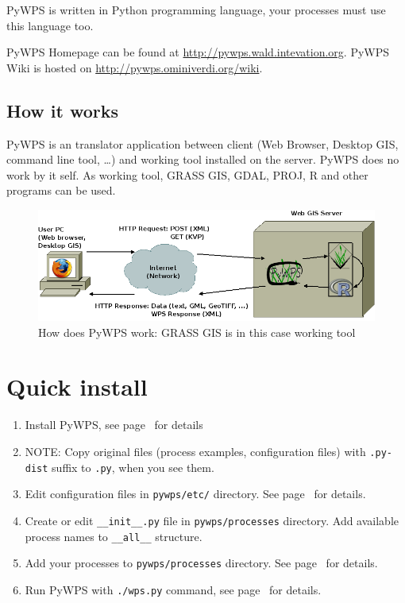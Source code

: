 \documentclass[a4paper,11pt]{article}
\newcommand{\pywpssite}{\url{http://pywps.wald.intevation.org}}
\newcommand{\pywpswiki}{\url{http://pywps.ominiverdi.org/wiki}}
\begin{document}
PyWPS is written in Python programming language, your processes must use
this language too. 

PyWPS Homepage can be found at \pywpssite.
PyWPS Wiki is hosted on \pywpswiki. 

\subsection{How it works}
PyWPS is an translator application between client (Web Browser, Desktop
GIS, command line tool, \dots) and working tool installed on the server.
PyWPS does no work by it self. As working tool, GRASS GIS, GDAL, PROJ, R
and other programs can be used.

\begin{figure}[ht]
\begin{center}
\includegraphics[width=1\textwidth]{pic/pywps-schema}
\caption{How does PyWPS work: GRASS GIS is in this case working tool}
\label{pic:pywps}
\end{center}
\end{figure}

\section{Quick install}
\begin{enumerate}
    \item Install PyWPS, see page~\pageref{install} for details
    \item NOTE: Copy original files (process examples, configuration files)
    with \texttt{.py-dist} suffix to \texttt{.py}, when you see them.
    \item Edit configuration files in \texttt{pywps/etc/} directory. See
    page~\pageref{configuration} for details.
    \item Create or edit \texttt{\_\_init\_\_.py} file in
    \texttt{pywps/processes} directory. Add available process names to
    \texttt{\_\_all\_\_} structure.
    \item Add your processes to \texttt{pywps/processes} directory. See
    page~\pageref{processes} for details.
    \item Run PyWPS with \texttt{./wps.py} command, see
    page~\pageref{testing} for details.
\end{enumerate}
\end{document}

